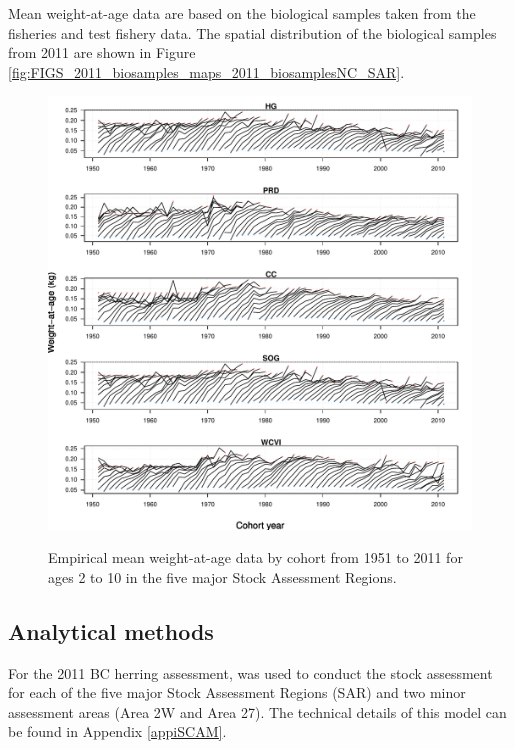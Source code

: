 Mean weight-at-age data are based on the biological samples taken from the fisheries and test fishery data.  The spatial distribution of the biological samples from 2011 are shown in Figure \ref{fig:FIGS_2011_biosamples_maps_2011_biosamplesNC_SAR}.

\begin{figure}[!tbp]
	\centering
	\includegraphics[width=\textwidth]{../Figs/iscam_fig_MeanWt.pdf}\\
	\caption{Empirical mean weight-at-age data by cohort from 1951 to 2011 for ages 2 to 10 in the five major Stock Assessment Regions.}\label{FigMeanWt}
\end{figure}
	

	\subsection{Analytical methods}

	For the 2011 BC herring assessment, \iscam was used to conduct the stock assessment for each of the five major Stock Assessment Regions (SAR) and two minor assessment areas (Area 2W and Area 27).  The technical details of this model can be found in Appendix \ref{appiSCAM}.
		

